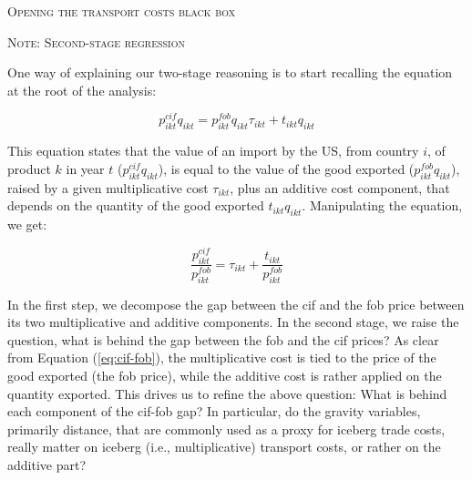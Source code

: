 \documentclass[a4paper,11pt]{article}
\begin{document}
\begin{center}
\begin{Large}
\textsc{Opening the transport costs black box} \\ \vspace{1 cm}

\textsc{Note: Second-stage regression}
\end{Large}
\end{center}


One way of explaining our two-stage reasoning is to start recalling the equation at the root of the analysis:

\begin{equation}
p^{cif}_{ikt} q_{ikt} = p^{fob}_{ikt} q_{ikt} \tau_{ikt} + t_{ikt} q_{ikt} \label{eq:cif-fob}
\end{equation}

This equation states that the value of an import by the US, from country $i$, of product $k$ in year $t$ ($p^{cif}_{ikt} q_{ikt}$), is equal to the value of the good exported ($p^{fob}_{ikt} q_{ikt}$), raised by a given multiplicative cost $\tau_{ikt}$, plus an additive cost component, that depends on the quantity of the good exported $ t_{ikt} q_{ikt}$. Manipulating the equation, we get:

\begin{equation}
\frac{p^{cif}_{ikt}}{p^{fob}_{ikt}} = \tau_{ikt} +\frac{t_{ikt}}{p^{fob}_{ikt}}
\label{eq:cif-fob2}
\end{equation}

In the first step, we decompose the gap between the cif and the fob price between its two multiplicative and additive components. In the second stage, we raise the question, what is behind the gap between the fob and the cif prices? As clear from Equation (\ref{eq:cif-fob}), the multiplicative cost is tied to the price of the good exported (the fob price), while the additive cost is rather applied on the quantity exported. This drives us to refine the above question: What is behind each component of the cif-fob gap? In particular, do the gravity variables, primarily distance, that are commonly used as a proxy for iceberg trade costs, really matter on iceberg (i.e., multiplicative) transport costs, or rather on the additive part?
\end{document}
